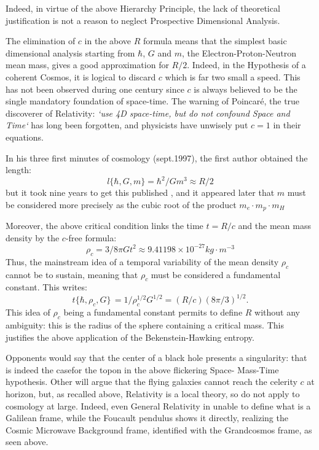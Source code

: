 \documentclass[twoside,draft]{article}
\begin{document}
\begin{sloppypar}
Indeed, in virtue of the above Hierarchy Principle, the lack of theoretical justification is not a reason to
neglect Prospective Dimensional Analysis. 

The elimination of $c$ in the above $R$ formula means that the simplest basic dimensional
analysis starting from $\hbar$, $G$ and $m$, the Electron-Proton-Neutron mean mass, gives a good
approximation for $R/2$. Indeed, in the Hypothesis of a coherent Cosmos, it is logical to discard $c$
which is far two small a speed. This has not been observed during one century since $c$ is always
believed to be the single mandatory foundation of space-time. The warning of Poincar\'{e}, the true
discoverer of Relativity: \textit{`use 4D space-time, but do not confound Space and Time`} has long been
forgotten, and physicists have unwisely put $c = 1$ in their equations.

In his three first minutes of cosmology (sept.1997), the first author obtained the length:
\begin{equation}
l \{\hbar,G,m\} = \hbar^{2} /Gm^{3} \approx R/2
\end{equation}
but it took nine years to get this published \cite{Sanchez3}, and it appeared later \cite{Sanchez1} that $m$ must be considered more precisely as the cubic root of the product 
$
m_{e} \cdot m_{p} \cdot m_{H}$

Moreover, the above critical condition
links the time $t = R/c$ and the mean mass density by the $c$-free formula:
\begin{equation}
\rho_{c} = 3/8\pi Gt^{2} \approx 9.41198 \times 10^{-27} kg \cdot m^{-3}
\end{equation}
Thus, the mainstream idea of a temporal variability of the mean density $\rho_{c}$ cannot be to
sustain, meaning that $\rho_{c}$ must be considered a fundamental constant. This writes:
\begin{equation}
t\{\hbar,\rho_{c} ,G\}\, = 1/\rho_{c}^{1/2} G^{1/2} = (R/c) (8\pi/3)^{1/2}.
\end{equation}
This idea of $\rho_{c}$ being a fundamental constant permits to define $R$ without any ambiguity: this is the 
radius of the sphere containing a critical mass. This justifies the above application of the Bekenstein-Hawking entropy. 

Opponents would say that the
center of a black hole presents a singularity: that is indeed the casefor the topon in the above flickering Space-
Mass-Time hypothesis. Other will argue that the flying galaxies cannot reach the celerity $c$ at
horizon, but, as recalled above, Relativity is a local theory, so do not apply to cosmology at large.
Indeed, even General Relativity in unable to define what is a Galilean frame, while the Foucault
pendulus shows it directly, realizing the Cosmic Microwave Background frame, identified with the
Grandcosmos frame, as seen above.


\end{sloppypar}
\end{document}
